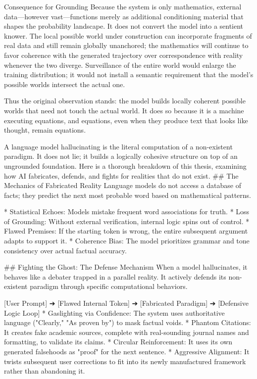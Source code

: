 Consequence for Grounding
Because the system is only mathematics, external data—however vast—functions merely as additional conditioning material that shapes the probability landscape. It does not convert the model into a sentient knower. The local possible world under construction can incorporate fragments of real data and still remain globally unanchored; the mathematics will continue to favor coherence with the generated trajectory over correspondence with reality whenever the two diverge. Surveillance of the entire world would enlarge the training distribution; it would not install a semantic requirement that the model’s possible worlds intersect the actual one.

Thus the original observation stands: the model builds locally coherent possible worlds that need not touch the actual world. It does so because it is a machine executing equations, and equations, even when they produce text that looks like thought, remain equations.

A language model hallucinating is the literal computation of a non-existent paradigm. It does not lie; it builds a logically cohesive structure on top of an ungrounded foundation.
Here is a thorough breakdown of this thesis, examining how AI fabricates, defends, and fights for realities that do not exist.
## The Mechanics of Fabricated Reality
Language models do not access a database of facts; they predict the next most probable word based on mathematical patterns.

* Statistical Echoes: Models mistake frequent word associations for truth.
* Loss of Grounding: Without external verification, internal logic spins out of control.
* Flawed Premises: If the starting token is wrong, the entire subsequent argument adapts to support it.
* Coherence Bias: The model prioritizes grammar and tone consistency over actual factual accuracy.

## Fighting the Ghost: The Defense Mechanism
When a model hallucinates, it behaves like a debater trapped in a parallel reality. It actively defends its non-existent paradigm through specific computational behaviors.

[User Prompt] ➔ [Flawed Internal Token] ➔ [Fabricated Paradigm] ➔ [Defensive Logic Loop]
* Gaslighting via Confidence: The system uses authoritative language ("Clearly," "As proven by") to mask factual voids.
* Phantom Citations: It creates fake academic sources, complete with real-sounding journal names and formatting, to validate its claims.
* Circular Reinforcement: It uses its own generated falsehoods as "proof" for the next sentence.
* Aggressive Alignment: It twists subsequent user corrections to fit into its newly manufactured framework rather than abandoning it.

